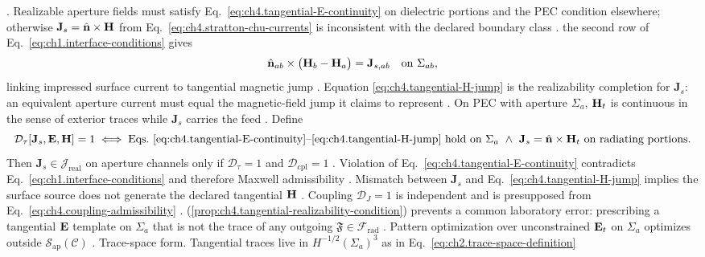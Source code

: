 \cite{stratton1941}. Realizable aperture fields must satisfy
Eq.~\eqref{eq:ch4.tangential-E-continuity} on dielectric portions and the PEC condition elsewhere; otherwise
\(\mathbf{J}_{s}=\hat{\mathbf{n}}\times\mathbf{H}\) from Eq.~\eqref{eq:ch4.stratton-chu-currents} is inconsistent with
the declared boundary class \cite{harrington2001}.
the second row of Eq.~\eqref{eq:ch1.interface-conditions} gives
\begin{equation}
\label{eq:ch4.tangential-H-jump}
\hat{\mathbf{n}}_{ab}\times\big(\mathbf{H}_{b}-\mathbf{H}_{a}\big)=\mathbf{J}_{s,ab}
\quad\text{on}\ \Sigma_{ab},
\end{equation}
linking impressed surface current to tangential magnetic jump \cite{stratton1941}. Equation
\eqref{eq:ch4.tangential-H-jump} is the realizability completion for \(\mathbf{J}_{s}\): an equivalent aperture
current must equal the magnetic-field jump it claims to represent \cite{harrington2001}. On PEC with
aperture \(\Sigma_{a}\), \(\mathbf{H}_{t}\) is continuous in the sense of exterior traces while \(\mathbf{J}_{s}\) carries
the feed \cite{stratton1941}.
\label{prop:ch4.tangential-realizability-condition}
Define
\begin{equation}
\label{eq:ch4.tangential-screen}
\mathcal{D}_{\tau}[\mathbf{J}_{s},\mathbf{E},\mathbf{H}]
=
1
\iff
\text{Eqs.~\eqref{eq:ch4.tangential-E-continuity}--\eqref{eq:ch4.tangential-H-jump} hold on }\Sigma_{a}
\ \wedge\
\mathbf{J}_{s}=\hat{\mathbf{n}}\times\mathbf{H}_{t}\ \text{on radiating portions}.
\end{equation}
Then \(\mathbf{J}_{s}\in\mathcal{J}_{\mathrm{real}}\) on aperture channels only if
\(\mathcal{D}_{\tau}=1\) and \(\mathcal{D}_{\mathrm{cpl}}=1\) \cite{stratton1941}.
Violation of Eq.~\eqref{eq:ch4.tangential-E-continuity} contradicts
Eq.~\eqref{eq:ch1.interface-conditions} and therefore Maxwell admissibility
\cite{stratton1941}. Mismatch between \(\mathbf{J}_{s}\) and
Eq.~\eqref{eq:ch4.tangential-H-jump} implies the surface source does not generate the declared tangential
\(\mathbf{H}\) \cite{harrington2001}. Coupling $\mathcal{D}_J=1$ is independent and is presupposed from
Eq.~\eqref{eq:ch4.coupling-admissibility} \cite{harrington2001}.
(\ref{prop:ch4.tangential-realizability-condition}) prevents a common laboratory error: prescribing a
tangential \(\mathbf{E}\) template on \(\Sigma_{a}\) that is not the trace of any outgoing \(\mathfrak{F}\in\mathcal{F}_{\mathrm{rad}}\)
\cite{stratton1941}. Pattern optimization over unconstrained \(\mathbf{E}_{t}\) on \(\Sigma_{a}\) optimizes
outside \(\mathcal{S}_{\mathrm{ap}}(\mathcal{C})\) \cite{hansen1988}.
Trace-space form. Tangential traces live in \(H^{-1/2}(\Sigma_{a})^{3}\) as in Eq.~\eqref{eq:ch2.trace-space-definition}
